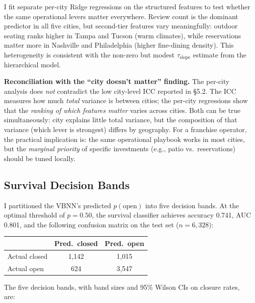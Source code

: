 \documentclass[10pt, letterpaper]{article}
\begin{document}
I fit separate per-city Ridge regressions on the structured features to test whether the same operational levers matter everywhere. Review count is the dominant predictor in all five cities, but second-tier features vary meaningfully: outdoor seating ranks higher in Tampa and Tucson (warm climates), while reservations matter more in Nashville and Philadelphia (higher fine-dining density). This heterogeneity is consistent with the non-zero but modest $\tau_{\text{slope}}$ estimate from the hierarchical model.

\textbf{Reconciliation with the ``city doesn't matter'' finding.} The per-city analysis does \emph{not} contradict the low city-level ICC reported in \S5.2. The ICC measures how much \emph{total} variance is between cities; the per-city regressions show that the \emph{ranking of which features matter} varies across cities. Both can be true simultaneously: city explains little total variance, but the composition of that variance (which lever is strongest) differs by geography. For a franchise operator, the practical implication is: the same operational playbook works in most cities, but the \emph{marginal priority} of specific investments (e.g., patio vs.\ reservations) should be tuned locally.

\subsection{Survival Decision Bands}

I partitioned the VBNN's predicted $p(\text{open})$ into five decision bands. At the optimal threshold of $p = 0.50$, the survival classifier achieves accuracy 0.741, AUC 0.801, and the following confusion matrix on the test set ($n = 6{,}328$):

\begin{center}\small
\renewcommand{\arraystretch}{1.2}
\begin{tabular}{@{}lcc@{}}
\toprule
& Pred.\ closed & Pred.\ open \\
\midrule
Actual closed & 1,142 & 1,015 \\
Actual open   & 624   & 3,547 \\
\bottomrule
\end{tabular}
\end{center}

The five decision bands, with band sizes and 95\% Wilson CIs on closure rates, are:
\end{document}
